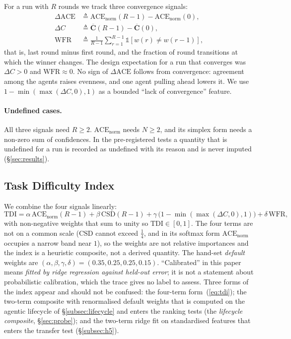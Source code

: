 \documentclass[10pt,a4paper]{article}
\begin{document}
For a run with $R$ rounds we track three convergence signals:
\begin{align}
  \Delta\mathrm{ACE}     &\triangleq \mathrm{ACE}_{\mathrm{norm}}(R-1) - \mathrm{ACE}_{\mathrm{norm}}(0), \\
  \Delta C               &\triangleq \overline{\mathbf{C}}(R-1) - \overline{\mathbf{C}}(0), \\
  \mathrm{WFR}           &\triangleq \frac{1}{R-1} \sum_{r=1}^{R-1} \mathbb{1}\!\left[w(r) \neq w(r-1)\right],
\end{align}
that is, last round minus first round, and the fraction of round transitions at
which the winner changes. The design expectation for a run that converges was
$\Delta C\!>\!0$ and $\mathrm{WFR}\!\approx\!0$. No sign of $\Delta\mathrm{ACE}$
follows from convergence: agreement among the agents raises evenness, and one
agent pulling ahead lowers it. We use $1-\min(\max(\Delta C,0),1)$ as a
bounded ``lack of convergence'' feature.

\paragraph{Undefined cases.} All three signals need $R\ge 2$. $\mathrm{ACE}_{\mathrm{norm}}$
needs $N\ge 2$, and its simplex form needs a non-zero sum of confidences. In the
pre-registered tests a quantity that is undefined for a run is recorded as
undefined with its reason and is never imputed (\S\ref{sec:results}).

\subsection{Task Difficulty Index}

We combine the four signals linearly:
\begin{equation}
  \mathrm{TDI} = \alpha\,\mathrm{ACE}_{\mathrm{norm}}(R-1)
               + \beta\,\mathrm{CSD}(R-1)
               + \gamma\,\bigl(1 - \min(\max(\Delta C, 0), 1)\bigr)
               + \delta\,\mathrm{WFR},
  \label{eq:tdi}
\end{equation}
with non-negative weights that sum to unity so $\mathrm{TDI}\!\in\![0,1]$. The
four terms are not on a common scale ($\mathrm{CSD}$ cannot exceed $\tfrac14$, and
in its softmax form $\mathrm{ACE}_{\mathrm{norm}}$ occupies a narrow band near $1$),
so the weights are not relative importances and the index is a heuristic
composite, not a derived quantity. The hand-set \emph{default} weights are
$(\alpha,\beta,\gamma,\delta)=(0.35,0.25,0.25,0.15)$. ``Calibrated'' in this paper
means \emph{fitted by ridge regression against held-out error}; it is not a
statement about probabilistic calibration, which the trace gives no label to
assess. Three forms of the index appear and should not be confused:
the four-term form~(\ref{eq:tdi}); the two-term composite with renormalised
default weights that is computed on the agentic lifecycle of
\S\ref{subsec:lifecycle} and enters the ranking tests (the \emph{lifecycle
composite}, \S\ref{sec:probe});
and the two-term ridge fit on standardised features that enters the transfer test
(\S\ref{subsec:h5}).
\end{document}
